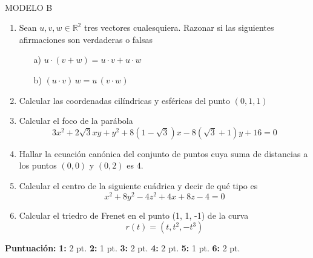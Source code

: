 \documentclass[a4paper, 12pt]{article}
\newcommand{\R}{\mathbb R}
\begin{document}
\

\large

MODELO B
\vskip 5mm
\begin{enumerate}
\item
Sean $u,v,w\in \R^2$ tres vectores cualesquiera. Razonar si las siguientes afirmaciones son verdaderas o falsas
\begin{itemize}
\item[a)]
$u\cdot(v+w)=u\cdot v+ u\cdot w$
\item[b)]
$(u\cdot v)\,w=u\,(v\cdot w)$
\end{itemize}
\vskip 15mm


\item
Calcular las coordenadas cilíndricas y esféricas del punto $(0,1, 1)$
\vskip 15mm
 

\item
Calcular el foco de la parábola
$$
3x^2 + 2\sqrt{3} xy + y^2 + 8(1-\sqrt{3})x -8(\sqrt{3}+1)y +16 = 0
$$
\vskip 15mm


\item
Hallar la ecuación canónica del conjunto de puntos cuya suma de distancias a los puntos $(0,0)$ y $(0,2)$ es $4$.
\vskip 15mm


\item
Calcular el centro de la siguiente cuádrica y decir de qué tipo es
$$
x^2+8y^2-4z^2+4x+8z-4=0
$$
\vskip 15mm


\item Calcular el triedro de Frenet en el punto (1, 1, -1) de la curva
$$
r(t)=(t, t^2, -t^3)
$$

\end{enumerate}

\vskip 17mm
\normalsize
\noindent
{\bf Puntuación:}
\hskip 5mm
{\bf 1:} 2 pt. \hskip 8mm 
{\bf 2:} 1 pt. \hskip 8mm
{\bf 3:} 2 pt. \hskip 8mm
{\bf 4:} 2 pt. \hskip 8mm
{\bf 5:} 1 pt. \hskip 8mm
{\bf 6:} 2 pt.
\pagebreak
\end{document}
